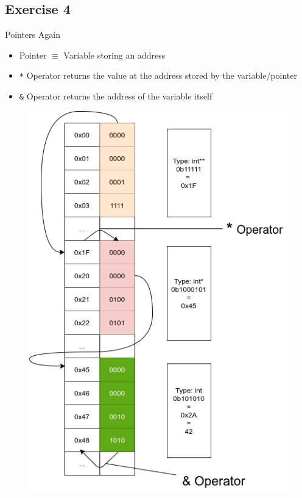 \documentclass[10pt]{beamer}
\begin{document}
\subsection*{Exercise 4}
\frame{\subsectionpage}
\begin{frame}{Pointers Again}
 \begin{itemize}
  \item Pointer $\equiv$ Variable storing an address
  \item \texttt{*} Operator returns the value at the address stored by the variable/pointer
  \item \texttt{&} Operator returns the address of the variable itself
 \end{itemize}
 \framebreak
 
     \begin{figure}
        \includegraphics[keepaspectratio, width=\textwidth, height=\textheight-2\baselineskip-2\baselineskip]{img/double_ptr.png} \\
    \end{figure}
    \framebreak
 

\end{frame}
\end{document}
